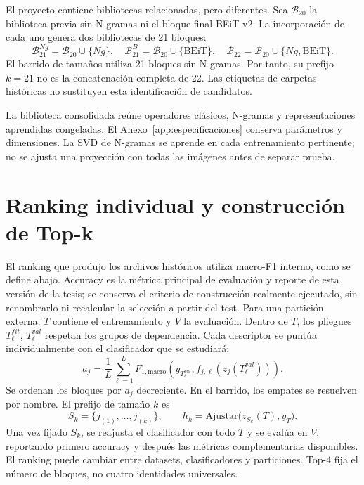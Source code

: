 El proyecto contiene bibliotecas relacionadas, pero diferentes. Sea \(\mathcal B_{20}\) la biblioteca previa sin N-gramas ni el bloque final BEiT-v2. La incorporación de cada uno genera dos bibliotecas de 21 bloques:
\begin{equation}
\mathcal B_{21}^{Ng}=\mathcal B_{20}\cup\{Ng\},\quad
\mathcal B_{21}^{B}=\mathcal B_{20}\cup\{\mathrm{BEiT}\},\quad
\mathcal B_{22}=\mathcal B_{20}\cup\{Ng,\mathrm{BEiT}\}.
\label{eq:tk-libraries}
\end{equation}
El barrido de tamaños utiliza 21 bloques sin N-gramas. Por tanto, su prefijo \(k=21\) no es la concatenación completa de 22. Las etiquetas de carpetas históricas no sustituyen esta identificación de candidatos.

La biblioteca consolidada reúne operadores clásicos, N-gramas y representaciones aprendidas congeladas. El Anexo~\ref{app:especificaciones} conserva parámetros y dimensiones. La SVD de N-gramas se aprende en cada entrenamiento pertinente; no se ajusta una proyección con todas las imágenes antes de separar prueba.

\section{Ranking individual y construcción de Top-k}
El ranking que produjo los archivos históricos utiliza macro-F1 interno, como se define abajo. Accuracy es la métrica principal de evaluación y reporte de esta versión de la tesis; se conserva el criterio de construcción realmente ejecutado, sin renombrarlo ni recalcular la selección a partir del test.
Para una partición externa, \(T\) contiene el entrenamiento y \(V\) la evaluación. Dentro de \(T\), los pliegues \(T_\ell^{fit}\), \(T_\ell^{val}\) respetan los grupos de dependencia. Cada descriptor se puntúa individualmente con el clasificador que se estudiará:
\begin{equation}
a_j=\frac{1}{L}\sum_{\ell=1}^{L}
 F_{1,\mathrm{macro}}\!\left(y_{T_\ell^{val}},
 f_{j,\ell}(z_j(T_\ell^{val}))\right).
\label{eq:tk-ranking}
\end{equation}
Se ordenan los bloques por \(a_j\) decreciente. En el barrido, los empates se resuelven por nombre. El prefijo de tamaño \(k\) es
\begin{equation}
S_k=\{j_{(1)},\ldots,j_{(k)}\},\qquad
h_k=\mathrm{Ajustar}\bigl(z_{S_k}(T),y_T\bigr).
\label{eq:tk-subset}
\end{equation}
Una vez fijado \(S_k\), se reajusta el clasificador con todo \(T\) y se evalúa en \(V\), reportando primero accuracy y después las métricas complementarias disponibles. El ranking puede cambiar entre datasets, clasificadores y particiones. Top-4 fija el número de bloques, no cuatro identidades universales.

